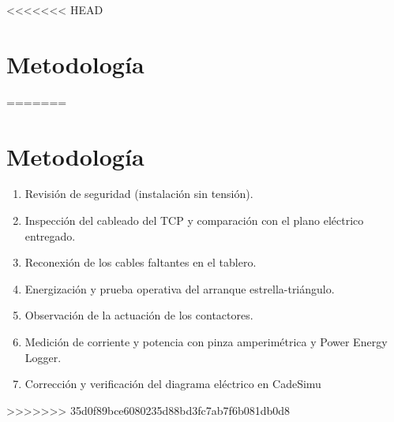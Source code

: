 <<<<<<< HEAD
\section{Metodología}
=======
\section{Metodología}
\begin{enumerate}
    \item Revisión de seguridad (instalación sin tensión).
    \item Inspección del cableado del TCP y comparación con el plano eléctrico entregado.
    \item Reconexión de los cables faltantes en el tablero.
    \item Energización y prueba operativa del arranque estrella-triángulo.
    \item Observación de la actuación de los contactores.
    \item Medición de corriente y potencia con pinza amperimétrica y Power Energy Logger.
    \item Corrección y verificación del diagrama eléctrico en CadeSimu 
\end{enumerate}
>>>>>>> 35d0f89bce6080235d88bd3fc7ab7f6b081db0d8
